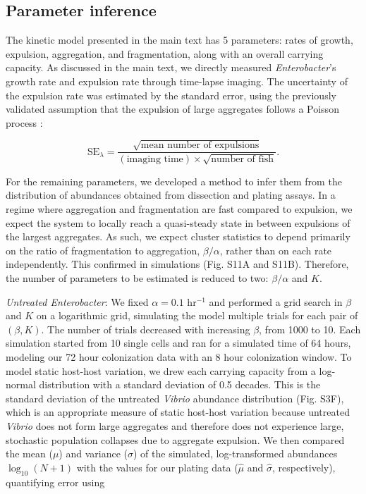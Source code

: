 \documentclass[12pt]{article}
\def\be{\begin{equation}}
\def\ee{\end{equation}}
\begin{document}
\subsection*{Parameter inference}
The kinetic model presented in the main text has 5 parameters: rates of growth, expulsion, aggregation, and fragmentation, along with an overall carrying capacity. As discussed in the main text, we directly measured \textit{Enterobacter}'s growth rate and expulsion rate through time-lapse imaging. The uncertainty of the expulsion rate was estimated by the standard error, using the previously validated assumption that the expulsion of large aggregates follows a Poisson process \cite{Wiles2016}:

\be
\text{SE}_{\lambda} = \frac{\sqrt{\text{mean number of expulsions}}}{(\text{imaging time})\times\sqrt{\text{number of fish}}}.
\ee

For the remaining parameters, we developed a method to infer them from the distribution of abundances obtained from dissection and plating assays. In a regime where aggregation and fragmentation are fast compared to expulsion, we expect the system to locally reach a quasi-steady state in between expulsions of the largest aggregates. As such, we expect cluster statistics to depend primarily on the ratio of fragmentation to aggregation, $\beta/\alpha$, rather than on each rate independently. This confirmed in simulations (Fig. S11A and S11B). Therefore, the number of parameters to be estimated is reduced to two: $\beta/\alpha$ and $K$. 

\textit{Untreated Enterobacter}:  We fixed $\alpha = 0.1$ hr$^{-1}$ and performed a grid search in $\beta$ and $K$ on a logarithmic grid, simulating the model multiple trials for each pair of $(\beta,K)$. The number of trials decreased with increasing $\beta$, from 1000 to 10. Each simulation started from 10 single cells and ran for a simulated time of 64 hours, modeling our 72 hour colonization data with an 8 hour colonization window. To model static host-host variation, we drew each carrying capacity from a log-normal distribution with a standard deviation of 0.5 decades. This is the standard deviation of the untreated \textit{Vibrio} abundance distribution (Fig. S3F), which is an appropriate measure of static host-host variation because untreated \textit{Vibrio} does not form large aggregates and therefore does not experience large, stochastic population collapses due to aggregate expulsion. We then compared the mean ($\mu$) and variance ($\sigma$) of the simulated, log-transformed abundances $\log_{10}(N+1)$ with the values for our plating data ($\hat{\mu}$ and $\hat{\sigma}$, respectively), quantifying error using 
\end{document}
